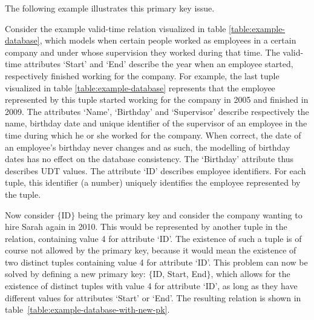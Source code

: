 The following example illustrates this primary key issue.

\begin{example}
\label{ex:pk}
Consider the example valid-time relation visualized in table \ref{table:example-database}, which models when certain people worked as employees in a certain company and under whose supervision they worked during that time. The valid-time attributes `Start' and `End' describe the year when an employee started, respectively finished working for the company. For example, the last tuple visualized in table \ref{table:example-database} represents that the employee represented by this tuple started working for the company in 2005 and finished in 2009. The attributes `Name', `Birthday' and `Supervisor' describe respectively the name, birthday date and unique identifier of the supervisor of an employee in the time during which he or she worked for the company. When correct, the date of an employee's birthday never changes and as such, the modelling of birthday dates has no effect on the database consistency. The `Birthday' attribute thus describes UDT values. The attribute `ID' describes employee identifiers. For each tuple, this identifier (a number) uniquely identifies the employee represented by the tuple. 

Now consider $\{$ID$\}$ being the primary key and consider the company wanting to hire Sarah again in 2010. This would be represented by another tuple in the relation, containing value 4 for attribute `ID'. The existence of such a tuple is of course not allowed by the primary key, because it would mean the existence of two distinct tuples containing value 4 for attribute `ID'. This problem can now be solved by defining a new primary key: $\{$ID, Start, End$\}$, which allows for the existence of distinct tuples with value 4 for attribute `ID', as long as they have different values for attributes `Start' or `End'. The resulting relation is shown in table~\ref{table:example-database-with-new-pk}.

\end{example}
